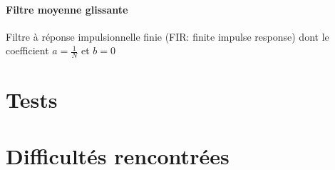 \documentclass{article}
\begin{document}
    \paragraph{Filtre moyenne glissante}
    Filtre à réponse impulsionnelle finie (FIR: finite impulse response) dont le coefficient $a = \frac{1}{N}$ et $b = 0$


    \section{Tests}

    \section{Difficultés rencontrées}





\end{document}
